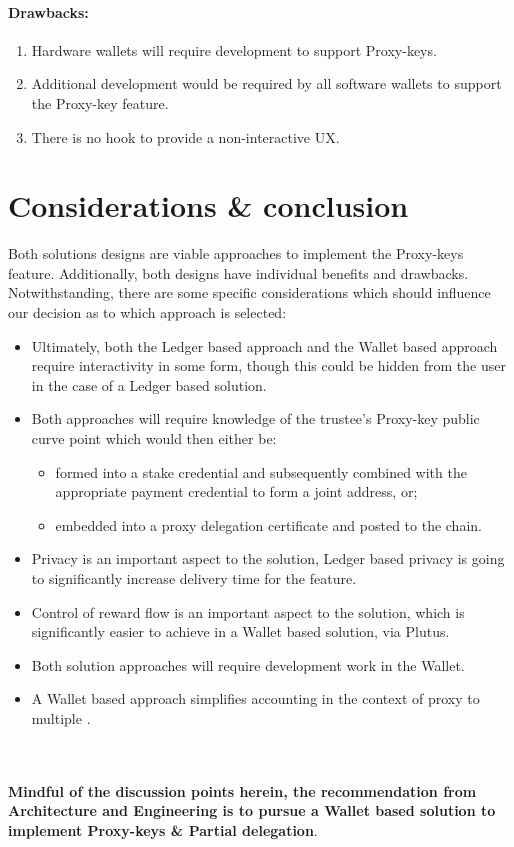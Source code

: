 \documentclass[11pt,a4paper]{article}
\begin{document}
\paragraph{Drawbacks:}
\begin{enumerate} 
  \item Hardware wallets will require development to support Proxy-keys.
  \item Additional development would be required by all software wallets to support the Proxy-key feature.
  \item There is no hook to provide a non-interactive UX.
\end{enumerate}

\pagebreak

\section{Considerations \& conclusion}
Both solutions designs are viable approaches to implement the Proxy-keys feature. Additionally, both designs have
individual benefits and drawbacks. Notwithstanding, there are some specific considerations which should influence our decision
as to which approach is selected:

\begin{itemize}
  \item Ultimately, both the Ledger based approach and the Wallet based approach require interactivity in some form, though this could be hidden from the user in the case of a Ledger based solution.
  \item Both approaches will require knowledge of the trustee's Proxy-key public curve point which would then either be:
    \begin{itemize}
      \item formed into a stake credential and subsequently combined with the appropriate payment credential to form a \gls{joint address}, or;
      \item embedded into a proxy delegation certificate and posted to the chain.
    \end{itemize}
    \item Privacy is an important aspect to the solution, Ledger based privacy is going to significantly increase delivery time for the feature. 
    \item Control of reward flow is an important aspect to the solution, which is significantly easier to achieve in a Wallet based solution, via Plutus.
    \item Both solution approaches will require development work in the Wallet. 
    \item A Wallet based approach simplifies accounting in the context of proxy to multiple .
  \end{itemize} 

\textbf{ \\ \\ Mindful of the discussion points herein, the recommendation from Architecture and Engineering is to pursue a Wallet
based solution to implement Proxy-keys \& Partial delegation}.
\pagebreak

\printglossaries
\end{document}
